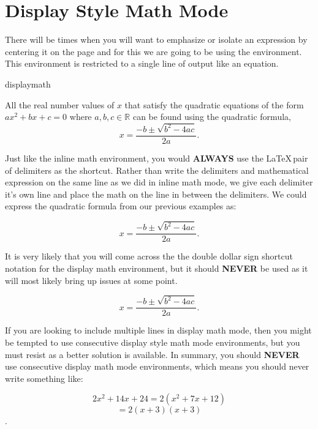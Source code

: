 \section{Display Style Math Mode}

There will be times when you will want to emphasize or isolate an expression
by centering it on the page and for this we are going to be using the 
 environment. This environment is restricted to 
a single line of output like an equation.

\begin{docEnvironment*}[doclang/environment content=mathematics content goes here]{displaymath}{}{}
\begin{dispExample}
All the real number values of \( x \) that satisfy the quadratic equations
of the form \( ax^2 + bx + c = 0 \) where \( a, b, c \in \mathbb{R} \) 
can be found using the quadratic formula,
\begin{displaymath}
  x = \frac{-b \pm \sqrt{b^2 - 4ac}}{2a}.
\end{displaymath}
\end{dispExample}
Just like the inline math environment, you would \textbf{ALWAYS} use the 
\LaTeX\,pair of \cs{[}  \cs{]} delimiters as the 
shortcut. Rather than write the delimiters and mathematical expression on the same 
line as we did in inline math mode, we give each delimiter it's own line 
and place the math on the line in between the delimiters. We could express the
quadratic formula from our previous examples as:
\begin{dispExample}
\[
  x = \frac{-b \pm \sqrt{b^2 - 4ac}}{2a}.
\]
\end{dispExample}
It is very likely that you will come across the the double dollar sign 
shortcut notation for the display math environment, but it should 
\textbf{NEVER} be used as it will most likely bring up issues at some point. 
\begin{dispExample}
$$
  x = \frac{-b \pm \sqrt{b^2 - 4ac}}{2a}.
$$
\end{dispExample} 
If you are looking to include multiple lines in display math mode, then
you might be tempted to use consecutive display style math mode 
environments, but you must resist as a better solution is available.
In summary, you should \textbf{NEVER} use consecutive display math mode 
environments, which means you should never write something like:
\begin{dispExample}
  \[ 
    2x^2 + 14x + 24 = 2( x^2 + 7x + 12 )
  \]
  \[ 
    = 2(x + 3)(x + 3) 
  \].
\end{dispExample}
\end{docEnvironment*}

